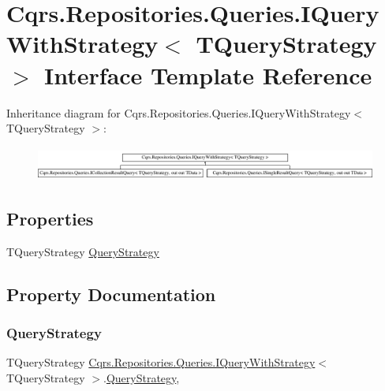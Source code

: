 \hypertarget{interfaceCqrs_1_1Repositories_1_1Queries_1_1IQueryWithStrategy}{}\section{Cqrs.\+Repositories.\+Queries.\+I\+Query\+With\+Strategy$<$ T\+Query\+Strategy $>$ Interface Template Reference}
\label{interfaceCqrs_1_1Repositories_1_1Queries_1_1IQueryWithStrategy}
Inheritance diagram for Cqrs.\+Repositories.\+Queries.\+I\+Query\+With\+Strategy$<$ T\+Query\+Strategy $>$\+:\begin{figure}[H]
\begin{center}
\leavevmode
\includegraphics[height=1.117764cm]{interfaceCqrs_1_1Repositories_1_1Queries_1_1IQueryWithStrategy}
\end{center}
\end{figure}
\subsection*{Properties}
\begin{DoxyCompactItemize}
\item 
T\+Query\+Strategy \hyperlink{interfaceCqrs_1_1Repositories_1_1Queries_1_1IQueryWithStrategy_a48ee82d7f6ff31e0ce25c09184982e34_a48ee82d7f6ff31e0ce25c09184982e34}{Query\+Strategy}
\end{DoxyCompactItemize}


\subsection{Property Documentation}
\mbox{\label{interfaceCqrs_1_1Repositories_1_1Queries_1_1IQueryWithStrategy_a48ee82d7f6ff31e0ce25c09184982e34_a48ee82d7f6ff31e0ce25c09184982e34}} 
\subsubsection{\texorpdfstring{Query\+Strategy}{QueryStrategy}}
{\footnotesize\ttfamily T\+Query\+Strategy \hyperlink{interfaceCqrs_1_1Repositories_1_1Queries_1_1IQueryWithStrategy}{Cqrs.\+Repositories.\+Queries.\+I\+Query\+With\+Strategy}$<$ T\+Query\+Strategy $>$.\hyperlink{classCqrs_1_1Repositories_1_1Queries_1_1QueryStrategy}{Query\+Strategy}\hspace{0.3cm}{\ttfamily [get]}, {\ttfamily [set]}}

